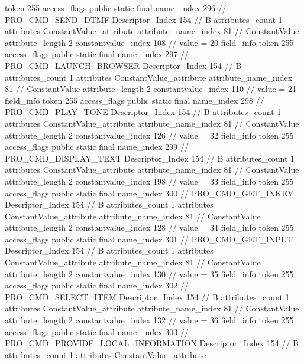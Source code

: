 {{{{{				token	255
				access_flags	public static final
				name_index	296		// PRO_CMD_SEND_DTMF
				Descriptor_Index	154		// B
				attributes_count	1
				attributes {
				ConstantValue_attribute {
					attribute_name_index	81		// ConstantValue
					attribute_length	2
					constantvalue_index	108		// value = 20
				}
				}
			}
			field_info {
				token	255
				access_flags	public static final
				name_index	297		// PRO_CMD_LAUNCH_BROWSER
				Descriptor_Index	154		// B
				attributes_count	1
				attributes {
				ConstantValue_attribute {
					attribute_name_index	81		// ConstantValue
					attribute_length	2
					constantvalue_index	110		// value = 21
				}
				}
			}
			field_info {
				token	255
				access_flags	public static final
				name_index	298		// PRO_CMD_PLAY_TONE
				Descriptor_Index	154		// B
				attributes_count	1
				attributes {
				ConstantValue_attribute {
					attribute_name_index	81		// ConstantValue
					attribute_length	2
					constantvalue_index	126		// value = 32
				}
				}
			}
			field_info {
				token	255
				access_flags	public static final
				name_index	299		// PRO_CMD_DISPLAY_TEXT
				Descriptor_Index	154		// B
				attributes_count	1
				attributes {
				ConstantValue_attribute {
					attribute_name_index	81		// ConstantValue
					attribute_length	2
					constantvalue_index	198		// value = 33
				}
				}
			}
			field_info {
				token	255
				access_flags	public static final
				name_index	300		// PRO_CMD_GET_INKEY
				Descriptor_Index	154		// B
				attributes_count	1
				attributes {
				ConstantValue_attribute {
					attribute_name_index	81		// ConstantValue
					attribute_length	2
					constantvalue_index	128		// value = 34
				}
				}
			}
			field_info {
				token	255
				access_flags	public static final
				name_index	301		// PRO_CMD_GET_INPUT
				Descriptor_Index	154		// B
				attributes_count	1
				attributes {
				ConstantValue_attribute {
					attribute_name_index	81		// ConstantValue
					attribute_length	2
					constantvalue_index	130		// value = 35
				}
				}
			}
			field_info {
				token	255
				access_flags	public static final
				name_index	302		// PRO_CMD_SELECT_ITEM
				Descriptor_Index	154		// B
				attributes_count	1
				attributes {
				ConstantValue_attribute {
					attribute_name_index	81		// ConstantValue
					attribute_length	2
					constantvalue_index	132		// value = 36
				}
				}
			}
			field_info {
				token	255
				access_flags	public static final
				name_index	303		// PRO_CMD_PROVIDE_LOCAL_INFORMATION
				Descriptor_Index	154		// B
				attributes_count	1
				attributes {
				ConstantValue_attribute {
}}}}}}}
